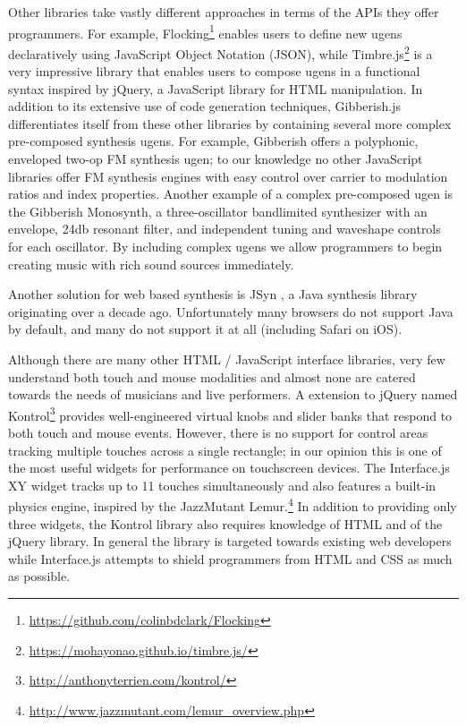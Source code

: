 Other libraries take vastly different approaches in terms of the APIs they offer programmers. For example, Flocking\footnote{\url{https://github.com/colinbdclark/Flocking}} enables users to define new ugens declaratively using JavaScript Object Notation (JSON), while Timbre.js\footnote{\url{https://mohayonao.github.io/timbre.js/}} is a very impressive library that enables users to compose ugens in a functional syntax inspired by jQuery, a JavaScript library for HTML manipulation. In addition to its extensive use of code generation techniques, Gibberish.js differentiates itself from these other libraries by containing several more complex pre-composed synthesis ugens. For example, Gibberish offers a polyphonic, enveloped two-op FM synthesis ugen; to our knowledge no other JavaScript libraries offer FM synthesis engines with easy control over carrier to modulation ratios and index properties. Another example of a complex pre-composed ugen is the Gibberish Monosynth, a three-oscillator bandlimited synthesizer with an envelope, 24db resonant filter, and independent tuning and waveshape controls for each oscillator. By including complex ugens we allow programmers to begin creating music with rich sound sources immediately.

Another solution for web based synthesis is JSyn \cite{Burk:1998}, a Java synthesis library originating over a decade ago. Unfortunately many browsers do not support Java by default, and many do not support it at all (including Safari on iOS).

Although there are many other HTML / JavaScript interface libraries, very few understand both touch and mouse modalities and almost none are catered towards the needs of musicians and live performers. A extension to jQuery named Kontrol\footnote{\url{http://anthonyterrien.com/kontrol/}} provides well-engineered virtual knobs and slider banks that respond to both touch and mouse events. However, there is no support for control areas tracking multiple touches across a single rectangle; in our opinion this is one of the most useful widgets for performance on touchscreen devices. The Interface.js XY widget tracks up to 11 touches simultaneously and also features a built-in physics engine, inspired by the JazzMutant Lemur.\footnote{\url{http://www.jazzmutant.com/lemur_overview.php}} In addition to providing only three widgets, the Kontrol library also requires knowledge of HTML and of the jQuery library. In general the library is targeted towards existing web developers while Interface.js attempts to shield programmers from HTML and CSS as much as possible.

